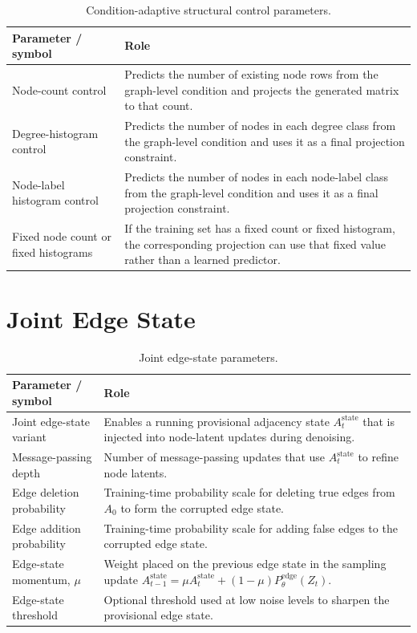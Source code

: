\begin{table}[p]
\centering
\footnotesize
\begin{tabularx}{\textwidth}{@{}p{}X@{}}
\toprule
Parameter / symbol & Role \\
\midrule
Node-count control & Predicts the number of existing node rows from the graph-level condition and projects the generated matrix to that count. \\
Degree-histogram control & Predicts the number of nodes in each degree class from the graph-level condition and uses it as a final projection constraint. \\
Node-label histogram control & Predicts the number of nodes in each node-label class from the graph-level condition and uses it as a final projection constraint. \\
Fixed node count or fixed histograms & If the training set has a fixed count or fixed histogram, the corresponding projection can use that fixed value rather than a learned predictor. \\
\bottomrule
\end{tabularx}
\caption{Condition-adaptive structural control parameters.}
\label{tab:generator-condition-control-parameters}
\end{table}

\section{Joint Edge State}

\begin{table}[p]
\centering
\footnotesize
\begin{tabularx}{\textwidth}{@{}p{}X@{}}
\toprule
Parameter / symbol & Role \\
\midrule
Joint edge-state variant & Enables a running provisional adjacency state \(A_t^{\mathrm{state}}\) that is injected into node-latent updates during denoising. \\
Message-passing depth & Number of message-passing updates that use \(A_t^{\mathrm{state}}\) to refine node latents. \\
Edge deletion probability & Training-time probability scale for deleting true edges from \(A_0\) to form the corrupted edge state. \\
Edge addition probability & Training-time probability scale for adding false edges to the corrupted edge state. \\
Edge-state momentum, \(\mu\) & Weight placed on the previous edge state in the sampling update \(A_{t-1}^{\mathrm{state}}=\mu A_t^{\mathrm{state}}+(1-\mu)P_\theta^{\mathrm{edge}}(Z_t)\). \\
Edge-state threshold & Optional threshold used at low noise levels to sharpen the provisional edge state. \\
\bottomrule
\end{tabularx}
\caption{Joint edge-state parameters.}
\label{tab:generator-joint-edge-parameters}
\end{table}

